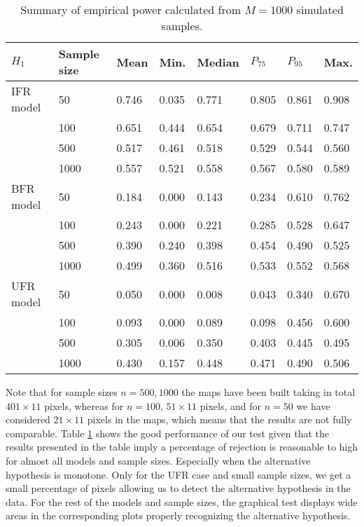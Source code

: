 \documentclass[preprint,12pt]{elsarticle}
\begin{document}
\begin{table}[htb]
\centering
\caption{Summary of empirical power calculated from $M=1000$ simulated samples.}
{\begin{tabular}{llllllll}
  $H_1$   & Sample size &   Mean & Min. & Median   & $P_{75}$ & $P_{95}$& Max.\\
\hline
IFR model &50        & 0.746& 0.035 & 0.771 & 0.805  & 0.861 & 0.908\\
          &100       & 0.651& 0.444 & 0.654 & 0.679  & 0.711 & 0.747\\
          &500       & 0.517& 0.461 & 0.518 & 0.529  & 0.544 & 0.560\\
          &1000      & 0.557& 0.521 & 0.558 & 0.567  & 0.580 & 0.589\\ \hline
BFR model &50        & 0.184& 0.000 & 0.143 & 0.234  & 0.610 & 0.762\\
          &100       & 0.243& 0.000 & 0.221 & 0.285  & 0.528 & 0.647\\
          &500       & 0.390& 0.240 & 0.398 & 0.454  & 0.490 & 0.525\\
          &1000      &0.499 & 0.360  & 0.516 & 0.533  & 0.552 & 0.568\\ \hline
UFR model &50        &0.050 & 0.000 & 0.008 & 0.043  & 0.340 & 0.670\\
          &100       &0.093 & 0.000  & 0.089 & 0.098  & 0.456 & 0.600 \\
          &500       &0.305 & 0.006  & 0.350 & 0.403  & 0.445 & 0.495\\
          &1000      &0.430 & 0.157  & 0.448 & 0.471  & 0.490 & 0.506\\ \hline

\end{tabular}}
\label{Tab:power}
\end{table}

Note that for sample sizes $n=500, 1000$ the maps have been built taking in total $401 \times 11$ pixels, whereas for $n=100$, $51 \times 11$ pixels, and for $n=50$ we have considered $21 \times 11$ pixels in the maps, which means that the results are not fully comparable. Table \ref{Tab:power} shows the good performance of our test given that the results presented in the table imply a percentage of rejection is reasonable to high for almost all models and sample sizes. Especially when the alternative hypothesis is monotone. Only for the UFR case and small sample sizes, we get a small percentage of pixels allowing us to detect the alternative hypothesis in the data. For the rest of the models and sample sizes, the graphical test displays wide areas in the corresponding plots properly recognizing the alternative hypothesis.
\end{document}
